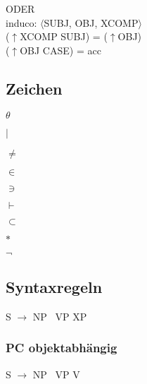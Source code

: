 \documentclass[12pt,a4paper]{article}
\begin{document}
ODER\\
induco: $\langle$SUBJ, OBJ, XCOMP$\rangle$\\
($\uparrow$XCOMP SUBJ) = ($\uparrow$OBJ)\\
($\uparrow$OBJ CASE) = acc\\

\subsection{Zeichen}

$\theta$

$\mid$

$\neq$

$\in$

$\ni$

$\vdash$

$\subset$

$\ast$

$\neg$


\subsection{Syntaxregeln}

S $\rightarrow$ NP \, VP \: XP\\


\subsubsection{PC objektabhängig}

S $\rightarrow$ NP \, VP \: V\\
\end{document}
